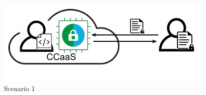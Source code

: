 \begin{figure}[htbp]
\begin{center}
\centerline{\includegraphics[scale=0.72]{figures/fg-scenario-1.pdf}}
\caption{Scenario 1}\label{fg-scenario_1}
\end{center}
\end{figure}